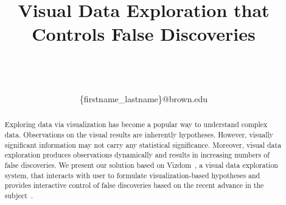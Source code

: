 \documentclass{sig}
\begin{document}
\title{Visual Data Exploration that Controls False Discoveries}

\author{
\alignauthor
\begin{tabular}{cccc}
\end{tabular}\\
\\
\{firstname\_lastname\}@brown.edu
}

\date{}
\maketitle

\begin{abstract}
Exploring data via visualization has become a popular way to understand complex data. Observations on the visual results are inherently hypotheses.  However, visually significant information may not carry any statistical significance. Moreover, visual data exploration produces observations dynamically and results in increasing numbers of false discoveries.  We present our solution based on Vizdom~\cite{vizdom}, a visual data exploration system, that interacts with user to formulate visualization-based hypotheses and provides interactive control of false discoveries based on the recent advance in the subject~\cite{controlling-false-discoveries}.
\end{abstract}




%








\balance
\begin{scriptsize}


\end{scriptsize}
\end{document}

